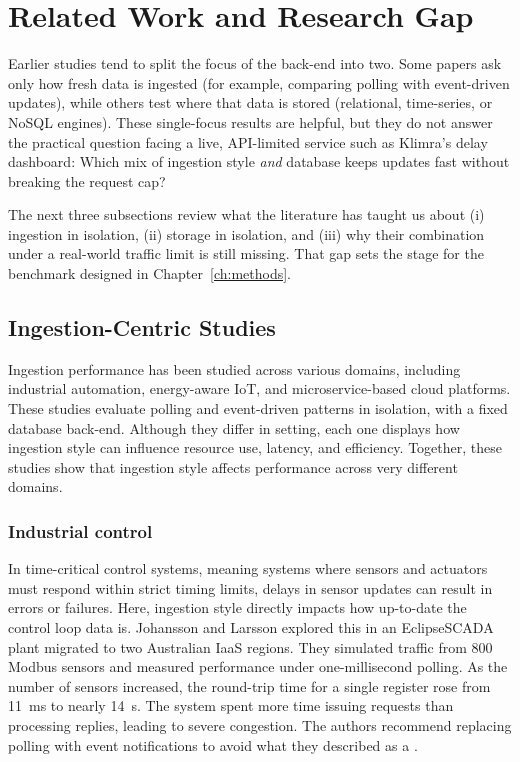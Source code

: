 \documentclass[nomenclature, english, biblatex]{kththesis}
\numberwithin{listing}{chapter}
\begin{document}
\section{Related Work and Research Gap}
\label{sec:gap}
Earlier studies tend to split the focus of the back-end into two.
Some papers ask only how fresh data is ingested (for example, comparing polling with event-driven updates), while others test where that data is stored (relational, time-series, or NoSQL engines).
These single-focus results are helpful, but they do not answer the practical question facing a live, API-limited service such as Klimra's delay dashboard: Which mix of ingestion style \textit{and} database keeps updates fast without breaking the request cap? 

The next three subsections review what the literature has taught us about (i) ingestion in isolation, (ii) storage in isolation, and (iii) why their combination under a real-world traffic limit is still missing. That gap sets the stage for the benchmark designed in Chapter~\ref{ch:methods}.




\subsection{Ingestion-Centric Studies}
Ingestion performance has been studied across various domains, including industrial automation, energy-aware \gls{IoT}, and microservice-based cloud platforms. These studies evaluate polling and event-driven patterns in isolation, with a fixed database back-end. Although they differ in setting, each one displays how ingestion style can influence resource use, latency, and efficiency. Together, these studies show that ingestion style affects performance across very different domains.

\subsubsection{Industrial control}
In time-critical control systems, meaning systems where sensors and actuators must respond within strict timing limits, delays in sensor updates can result in errors or failures. Here, ingestion style directly impacts how up-to-date the control loop data is.
Johansson and Larsson explored this in an EclipseSCADA plant migrated to two Australian IaaS regions. They simulated traffic from 800 Modbus sensors and measured performance under one-millisecond polling. As the number of sensors increased, the round-trip time for a single register rose from \SI{11}{\milli\second} to nearly \SI{14}{\second}. The system spent more time issuing requests than processing replies, leading to severe congestion. The authors recommend replacing polling with event notifications to avoid what they described as a  \cite{Johansson2021SCADAIaaS}.
\end{document}

